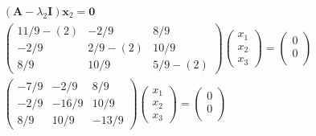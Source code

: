 \documentclass[12pt]{article}
\begin{document}
\begin{equation*}
	\begin{array}{c}
		\left(\mathbf{A}-\lambda_{2} \mathbf{I}\right) \mathbf{x}_{2}=\mathbf{0}                                            \\
		\left(\begin{array}{ccc}
				11 / 9-(2) & -2 / 9    & 8 / 9     \\
				-2 / 9     & 2 / 9-(2) & 10 / 9    \\
				8 / 9      & 10 / 9    & 5 / 9-(2)
			\end{array}\right)\left(\begin{array}{l}
				x_{1} \\
				x_{2} \\
				x_{3}
			\end{array}\right)=\left(\begin{array}{c}
				0 \\
				0 \\

			\end{array}\right) \\
		\left(\begin{array}{ccc}
				-7 / 9 & -2 / 9  & 8 / 9   \\
				-2 / 9 & -16 / 9 & 10 / 9  \\
				8 / 9  & 10 / 9  & -13 / 9
			\end{array}\right)\left(\begin{array}{l}
				x_{1} \\
				x_{2} \\
				x_{3}
			\end{array}\right)=\left(\begin{array}{l}
				0 \\
				0 \\

			\end{array}\right)
	\end{array}
\end{equation*}
\end{document}
